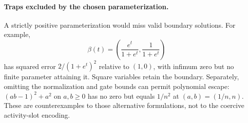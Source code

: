 \paragraph{Traps excluded by the chosen parameterization.}
A strictly positive parameterization would miss valid boundary solutions.
For example,
\[
 \beta(t)=\left(\frac{e^t}{1+e^t},\frac{1}{1+e^t}\right)
\]
has squared error $2/(1+e^t)^2$ relative to $(1,0)$, with infimum zero but
no finite parameter attaining it.  Square variables retain the boundary.
Separately, omitting the normalization and gate bounds can permit
polynomial escape: $(ab-1)^2+a^2$ on $a,b\geq0$ has no zero but equals
$1/n^2$ at $(a,b)=(1/n,n)$.  These are counterexamples to those alternative
formulations, not to the coercive activity-slot encoding.
